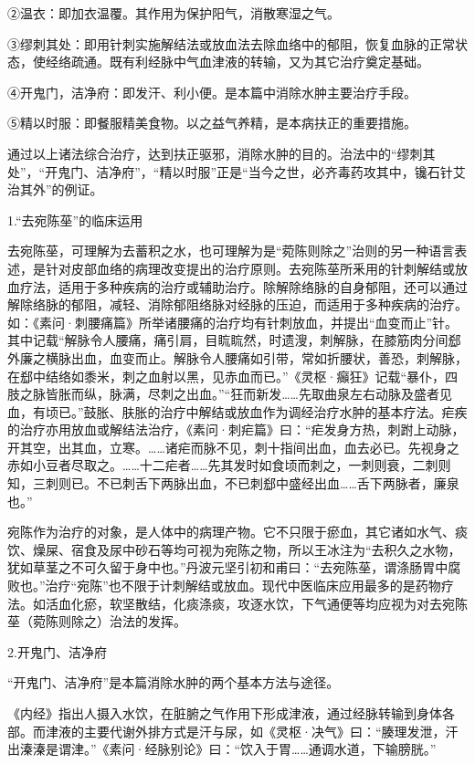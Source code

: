 \documentclass[draft,12pt]{ctexbook}
\begin{document}
②温衣：即加衣温覆。其作用为保护阳气，消散寒湿之气。

③缪刺其处：即用针刺实施解结法或放血法去除血络中的郁阻，恢复血脉的正常状态，使经络疏通。既有利经脉中气血津液的转输，又为其它治疗奠定基础。

④开鬼门，洁净府：即发汗、利小便。是本篇中消除水肿主要治疗手段。

⑤精以时服：即餐服精美食物。以之益气养精，是本病扶正的重要措施。

通过以上诸法综合治疗，达到扶正驱邪，消除水肿的目的。治法中的“缪刺其处”，“开鬼门、洁净府”，“精以时服”正是“当今之世，必齐毒药攻其中，镵石针艾治其外”的例证。


1.“去宛陈莝”的临床运用

去宛陈莝，可理解为去蓄积之水，也可理解为是“菀陈则除之”治则的另一种语言表述，是针对皮部血络的病理改变提出的治疗原则。去宛陈莝所釆用的针刺解结或放血疗法，适用于多种疾病的治疗或辅助治疗。除解除络脉的自身郁阻，还可以通过解除络脉的郁阻，减轻、消除郁阻络脉对经脉的压迫，而适用于多种疾病的治疗。如：《素问·刺腰痛篇》所举诸腰痛的治疗均有针刺放血，并提出“血变而止”针。其中记载“解脉令人腰痛，痛引肩，目䀮䀮然，时遗溲，刺解脉，在膝筋肉分间郄外廉之横脉出血，血变而止。解脉令人腰痛如引带，常如折腰状，善恐，刺解脉，在郄中结络如黍米，刺之血射以黑，见赤血而已。”《灵枢·癲狂》记载“暴仆，四肢之脉皆胀而纵，脉满，尽刺之出血。”“狂而新发……先取曲泉左右动脉及盛者见血，有顷已。”鼓胀、肤胀的治疗中解结或放血作为调经治疗水肿的基本疗法。疟疾的治疗亦用放血或解结法治疗，《素问·刺疟篇》曰：“疟发身方热，刺跗上动脉，开其空，出其血，立寒。……诸疟而脉不见，刺十指间出血，血去必已。先视身之赤如小豆者尽取之。……十二疟者……先其发时如食顷而刺之，一刺则衰，二刺则知，三刺则已。不已刺舌下两脉出血，不已刺郄中盛经出血……舌下两脉者，廉泉也。”

宛陈作为治疗的对象，是人体中的病理产物。它不只限于瘀血，其它诸如水气、痰饮、燥屎、宿食及尿中砂石等均可视为宛陈之物，所以王冰注为“去积久之水物，犹如草茎之不可久留于身中也。”丹波元坚引初和甫曰：“去宛陈莝，谓涤肠胃中腐败也。”治疗“宛陈”也不限于计刺解结或放血。现代中医临床应用最多的是药物疗法。如活血化瘀，软坚散结，化痰涤痰，攻逐水饮，下气通便等均应视为对去宛陈莝（菀陈则除之）治法的发挥。

2.开鬼门、洁净府

“开鬼门、洁净府”是本篇消除水肿的两个基本方法与途径。

《内经》指出人摄入水饮，在脏腑之气作用下形成津液，通过经脉转输到身体各部。而津液的主要代谢外排方式是汗与尿，如《灵枢·决气》曰：“腠理发泄，汗出溱溱是谓津。”《素问·经脉别论》曰：“饮入于胃……通调水道，下输膀胱。”
\end{document}
